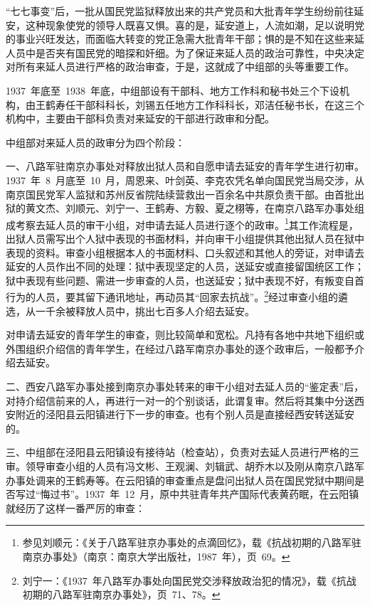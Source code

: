 “七七事变”后，一批从国民党监狱释放出来的共产党员和大批青年学生纷纷前往延安，这种现象使党的领导人既喜又惧。喜的是，延安道上，人流如潮，足以说明党的事业兴旺发达，而面临大转变的党正急需大批青年干部；惧的是不知在这些来延人员中是否夹有国民党的暗探和奸细。为了保证来延人员的政治可靠性，中央决定对所有来延人员进行严格的政治审查，于是，这就成了中组部的头等重要工作。

1937~年底至~1938~年底，中组部设有干部科、地方工作科和秘书处三个下设机构，由王鹤寿任干部科科长，刘锡五任地方工作科科长，邓洁任秘书长，在这三个机构中，主要由干部科负责对来延安的干部进行政审和分配。

中组部对来延人员的政审分为四个阶段：

一、八路军驻南京办事处对释放出狱人员和自愿申请去延安的青年学生进行初审。1937~年~8~月底至~10~月，周恩来、叶剑英、李克农凭名单向国民党当局交涉，从南京国民党军人监狱和苏州反省院陆续营救出一百余名中共原负责干部。由首批出狱的黄文杰、刘顺元、刘宁一、王鹤寿、方毅、夏之栩等，在南京八路军办事处组成考察去延人员的审干小组，对申请去延人员进行逐个的政审。\footnote{参见刘顺元：《关于八路军驻京办事处的点滴回忆》，载《抗战初期的八路军驻南京办事处》（南京：南京大学出版社，1987~年），页~69。}其工作流程是，出狱人员需写出个人狱中表现的书面材料，并向审干小组提供其他出狱人员在狱中表现的资料。审查小组根据本人的书面材料、口头叙述和其他人的旁证，对申请去延安的人员作出不同的处理：狱中表现坚定的人员，送延安或直接留国统区工作；狱中表现有些问题、需进一步审查的人员，也送延安；狱中表现不好，有叛变自首行为的人员，要其留下通讯地址，再动员其“回家去抗战”。\footnote{刘宁一：《1937~年八路军办事处向国民党交涉释放政治犯的情况》，载《抗战初期的八路军驻南京办事处》，页~71、78。}经过审查小组的遴选，从一千余被释放人员中，挑出七百多人介绍去延安。

对申请去延安的青年学生的审查，则比较简单和宽松。凡持有各地中共地下组织或外围组织介绍信的青年学生，在经过八路军南京办事处的逐个政审后，一般都予介绍去延安。

二、西安八路军办事处接到南京办事处转来的审干小组对去延人员的“鉴定表”后，对持介绍信前来的人，再进行一对一的个别谈话，此谓复审。然后将其集中分送西安附近的泾阳县云阳镇进行下一步的审查。也有个别人员是直接经西安转送延安的。

三、中组部在泾阳县云阳镇设有接待站（检查站），负责对去延人员进行严格的三审。领导审查小组的人员有冯文彬、王观澜、刘辑武、胡乔木以及刚从南京八路军办事处调来的王鹤寿等。在云阳镇的审查重点是盘问出狱人员在国民党狱中期间是否写过“悔过书”。1937~年~12~月，原中共驻青年共产国际代表黄药眠，在云阳镇就经历了这样一番严厉的审查：

